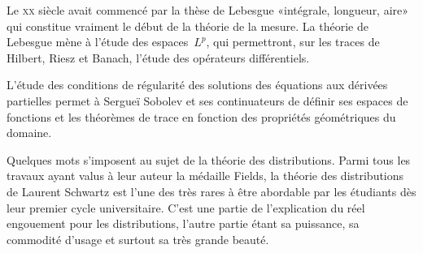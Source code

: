 \medskip
\begin{histoire}%
Le \textsc{xx} siècle avait commencé par la thèse de Lebesgue  «intégrale, longueur, aire» qui constitue vraiment le début de la théorie de la mesure.
La théorie de Lebesgue mène à l'étude des espaces~$L^p$, qui permettront, sur les traces de Hilbert, Riesz et Banach, l'étude des opérateurs différentiels.

\medskip
{}

\medskip
L'étude des conditions de régularité des solutions des équations aux dérivées partielles permet à Sergueï Sobolev et ses continuateurs de définir ses espaces de fonctions et les théorèmes de trace en fonction des propriétés géométriques du domaine.

\medskip
Quelques mots s'imposent au sujet de la théorie des distributions.
Parmi tous les travaux ayant valus à leur auteur la médaille Fields, la théorie des distributions de Laurent Schwartz est l'une des très rares à être abordable par les étudiants dès leur premier cycle universitaire. C'est une partie de l'explication du réel engouement pour les distributions, l'autre partie étant sa puissance, sa commodité d'usage et surtout sa très grande beauté.


\end{histoire}
